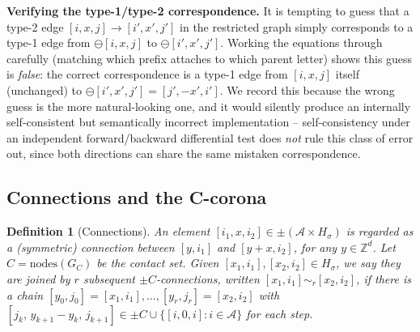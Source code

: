 \documentclass[11pt]{article}
\newtheorem{definition}{Definition}
\begin{document}
\begin{correction}
\textbf{Verifying the type-1/type-2 correspondence.} It is tempting to guess
that a type-2 edge $[i,x,j]\to[i',x',j']$ in the restricted graph simply
corresponds to a type-1 edge from $\ominus[i,x,j]$ to $\ominus[i',x',j']$.
Working the equations through carefully (matching which prefix attaches to
which parent letter) shows this guess is \emph{false}: the correct
correspondence is a type-1 edge from $[i,x,j]$ itself (unchanged) to
$\ominus[i',x',j'] = [j',-x',i']$. We record this because the wrong guess is
the more natural-looking one, and it would silently produce an internally
self-consistent but semantically incorrect implementation -- self-consistency
under an independent forward/backward differential test does \emph{not} rule
this class of error out, since both directions can share the same mistaken
correspondence.
\end{correction}

\subsection{Connections and the C-corona}

\begin{definition}[Connections]
An element $[i_1,x,i_2]\in\pm(\mathcal{A}\times H_\sigma)$ is regarded as a
(symmetric) connection between $[y,i_1]$ and $[y+x,i_2]$, for any
$y\in\mathbb{Z}^d$. Let $C=\mathrm{nodes}(G_C)$ be the contact set. Given
$[x_1,i_1],[x_2,i_2]\in H_\sigma$, we say they are joined by $r$ subsequent
$\pm C$-connections, written $[x_1,i_1]\sim_r[x_2,i_2]$, if there is a chain
$[y_0,j_0]=[x_1,i_1],\dots,[y_r,j_r]=[x_2,i_2]$ with
$[j_k,\,y_{k+1}-y_k,\,j_{k+1}]\in\pm C\cup\{[i,0,i]:i\in\mathcal{A}\}$ for each
step.
\end{definition}
\end{document}
